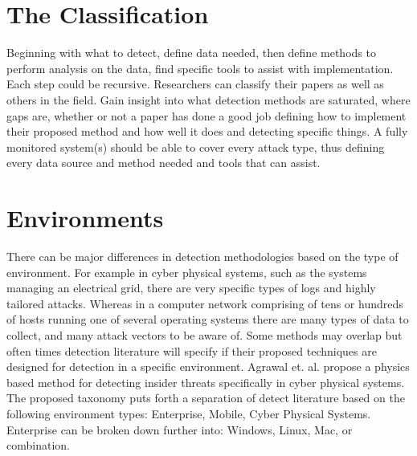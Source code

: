 \documentclass[conference]{IEEEtran}
\begin{document}
\section{The Classification}
Beginning with what to detect, define data needed, then define methods to perform analysis on the data, find specific tools to assist with implementation. Each step could be recursive. Researchers can classify their papers as well as others in the field. Gain insight into what detection methods are saturated, where gaps are, whether or not a paper has done a good job defining how to implement their proposed method and how well it does and detecting specific things. A fully monitored system(s) should be able to cover every attack type, thus defining every data source and method needed and tools that can assist. 

\section{Environments}
 There can be major differences in detection methodologies based on the type of environment. For example in cyber physical systems, such as the systems managing an electrical grid, there are very specific types of logs and highly tailored attacks. Whereas in a computer network comprising of tens or hundreds of hosts running one of several operating systems there are many types of data to collect, and many attack vectors to be aware of. Some methods may overlap but often times detection literature will specify if their proposed techniques are designed for detection in a specific environment. Agrawal et. al. propose a physics based method for detecting insider threats specifically in cyber physical systems\cite{agrawal2018poster}.
The proposed taxonomy puts forth a separation of detect literature based on the following environment types: Enterprise, Mobile, Cyber Physical Systems. Enterprise can be broken down further into: Windows, Linux, Mac, or combination.
\end{document}
